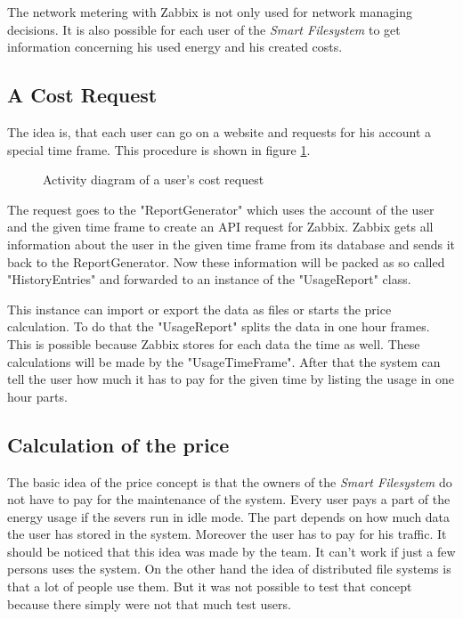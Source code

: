 The network metering with Zabbix is not only used for network managing decisions. It is also possible for each user of the \textit{Smart Filesystem} to get information concerning his used energy and his created costs.
\subsection{A Cost Request}
 The idea is, that each user can go on a website and requests for his account a special time frame. This procedure is shown in figure \ref{akt}.
 \begin{figure}
 \centering
 
 \caption{Activity diagram of a user's cost request}
 \label{akt}
 \end{figure}


 The request goes to the "ReportGenerator" which uses the account of the user and the given time frame to create an API request for Zabbix. Zabbix gets all information about the user in the given time frame from its database and sends it back to the ReportGenerator. Now these information will be packed as so called "HistoryEntries" and forwarded to an instance of the "UsageReport" class. 
 
 This instance can import or export the data as files or starts the price calculation. To do that the "UsageReport" splits the data in one hour frames. This is possible because Zabbix stores for each data the time as well. These calculations will be made by the "UsageTimeFrame". After that the system can tell the user how much it has to pay for the given time by listing the usage in one hour parts.
 
 \subsection{Calculation of the price} 
 The basic idea of the price concept is that the owners of the \textit{Smart Filesystem} do not have to pay for the maintenance of the system. Every user pays a part of the energy usage if the severs run in idle mode. The part depends on how much data the user has stored in the system. Moreover the user has to pay for his traffic. It should be noticed that this idea was made by the team. It can't work if just a few persons uses the system. On the other hand the idea of distributed file systems is that a lot of people use them. But it was not possible to test that concept because there simply were not that much test users. 
 
